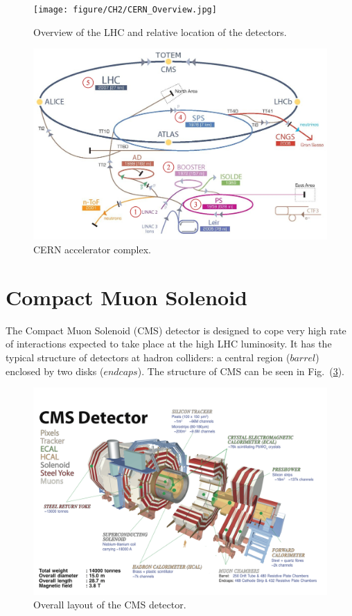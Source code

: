 \begin{figure}[hbtp]
  \begin{center}
    \texttt{[image: figure/CH2/CERN\_Overview.jpg]}
  \end{center}
  \caption{\label{fig:LHC_overview}Overview of the LHC and relative location of the detectors.}
\end{figure}

\begin{figure}[hbtp]
  \begin{center}
    \includegraphics[width=\textwidth]{figure/CH2/complex.png}
  \end{center}
  \caption{\label{fig:accelerator}CERN accelerator complex.}
\end{figure}

\section{Compact Muon Solenoid}
The Compact Muon Solenoid (CMS) detector is designed to cope very high rate of interactions expected to take place at the high LHC luminosity. It has the typical structure of detectors at hadron colliders: a central region ($barrel$) enclosed by two disks ($endcaps$). The structure of CMS can be seen in Fig.~(\ref{fig:CMS}).

\begin{figure}[hbtp]
  \begin{center}
    \includegraphics[width=\textwidth]{figure/CH2/CMS.png}
  \end{center}
  \caption{\label{fig:CMS}Overall layout of the CMS detector.}
\end{figure}
